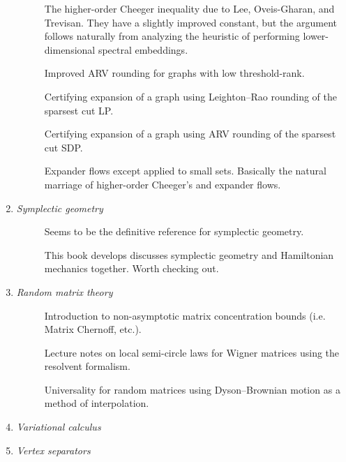 \documentclass{article}
\theoremstyle{definition}
\begin{document}
\begin{enumerate}[--]
\begin{description}
\item[\cite{LGT14}] The higher-order Cheeger inequality due to Lee, Oveis-Gharan, and Trevisan. They have a slightly improved constant, but the argument follows naturally from analyzing the heuristic of performing lower-dimensional spectral embeddings.

\item[\cite{GL13}] Improved ARV rounding for graphs with low threshold-rank.

\item[\cite{LR99}] Certifying expansion of a graph using Leighton--Rao rounding of the sparsest cut LP.

\item[\cite{ARV09}] Certifying expansion of a graph using ARV rounding of the sparsest cut SDP.

\item[\cite{AGS13}] Expander flows except applied to small sets. Basically the natural marriage of higher-order Cheeger's and expander flows.
\end{description}


\item \emph{Symplectic geometry}
\begin{description}
\item[\cite{DS08}] Seems to be the definitive reference for symplectic geometry.

\item[\cite{RSS12}] This book develops discusses symplectic geometry and Hamiltonian mechanics together. Worth checking out.
\end{description}


\item \emph{Random matrix theory}
\begin{description}
\item[\cite{Tro15}] Introduction to non-asymptotic matrix concentration bounds (i.e. Matrix Chernoff, etc.).
\item[\cite{BGK16}] Lecture notes on local semi-circle laws for Wigner matrices using the resolvent formalism.
\item[\cite{EY17}] Universality for random matrices using Dyson--Brownian motion as a method of interpolation.
\end{description}


\item \emph{Variational calculus}
%


\item \emph{Vertex separators}
%

\end{enumerate}
\end{document}
